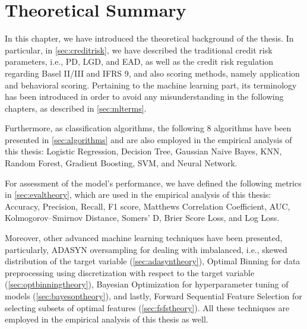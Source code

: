 \newpage
\section{Theoretical Summary}

In this chapter, we have introduced the theoretical background of the thesis.
In particular, in \autoref{sec:creditrisk}, we have described the traditional credit risk parameters, i.e., PD, LGD, and EAD, as well as the credit risk regulation regarding Basel II/III and IFRS 9, and also scoring methods, namely application and behavioral scoring.
Pertaining to the machine learning part, its terminology has been introduced in order to avoid any misunderstanding in the following chapters, as described in \autoref{sec:mlterms}.


Furthermore, as classification algorithms, the following 8 algorithms have been presented in \autoref{sec:algorithms} and are also employed in the empirical analysis of this thesis: Logistic Regression, Decision Tree, Gaussian Naive Bayes, KNN, Random Forest, Gradient Boosting, SVM, and Neural Network.


For assessment of the model's performance, we have defined the following metrics in \autoref{sec:evaltheory}, which are used in the empirical analysis of this thesis: Accuracy, Precision, Recall, F1 score, Matthews Correlation Coefficient, AUC, Kolmogorov--Smirnov Distance, Somers' D, Brier Score Loss, and Log Loss.


Moreover, other advanced machine learning techniques have been presented, particularly, ADASYN oversampling for dealing with imbalanced, i.e., skewed distribution of the target variable (\autoref{sec:adasyntheory}), Optimal Binning for data preprocessing using discretization with respect to the target variable (\autoref{sec:optbinningtheory}),
Bayesian Optimization for hyperparameter tuning of models (\autoref{sec:bayesoptheory}), and lastly, Forward Sequential Feature Selection for selecting subsets of optimal features (\autoref{sec:fsfstheory}).
All these techniques are employed in the empirical analysis of this thesis as well.